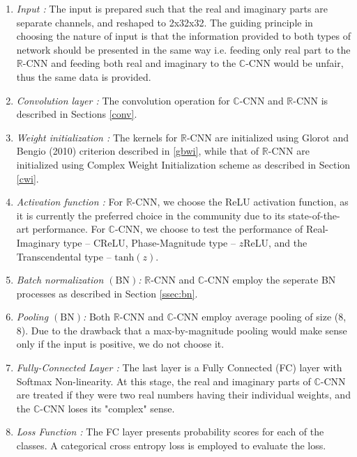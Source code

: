  
 \begin{enumerate}
 	\item \textit{Input :} The input is prepared such that the real and imaginary parts are separate channels, and reshaped to 2x32x32. The guiding principle in choosing the nature of input is that the information provided to both types of network should be presented in the same way i.e. feeding only real part to the $\mathbb{R}$-CNN and feeding both real and imaginary to the $\mathbb{C}$-CNN would be unfair, thus the same data is provided. 
 	\item \textit{Convolution layer :} The convolution operation for $\mathbb{C}$-CNN and $\mathbb{R}$-CNN is described in Sections \ref{conv}.
 	\item \textit{Weight initialization :} The kernels for $\mathbb{R}$-CNN are initialized using Glorot and Bengio (2010) criterion \cite{glorot2010understanding} described in \ref{gbwi}, while that of $\mathbb{R}$-CNN are initialized using Complex Weight Initialization scheme \cite{trabelsi2018deep} as described in Section \ref{cwi}.
 	 
 	\item \textit{Activation function :} For $\mathbb{R}$-CNN, we choose the ReLU activation function, as it is currently the preferred choice in the community due to its state-of-the-art performance. For $\mathbb{C}$-CNN, we choose to test the performance of Real-Imaginary type -- $\mathrm{C}$ReLU, Phase-Magnitude type --  $z$ReLU, and the Transcendental type -- $\mathrm{tanh}(z)$.
 	
 	\item \textit{Batch normalization $(\mathrm{BN})$:} $\mathbb{R}$-CNN and $\mathbb{C}$-CNN employ the seperate BN processes as described in Section \ref{ssec:bn}.
 	
 	\item \textit{Pooling $(\mathrm{BN})$:} Both $\mathbb{R}$-CNN and $\mathbb{C}$-CNN employ average pooling of size (8,  8). Due to the drawback that a max-by-magnitude pooling would make sense only if the input is positive, we do not choose it. 
 	
 	\item \textit{Fully-Connected Layer :}  The last layer is a Fully Connected (FC) layer with Softmax Non-linearity. At this stage, the real and imaginary parts of $\mathbb{C}$-CNN are treated if they were two real numbers having their individual weights, and the $\mathbb{C}$-CNN loses its "complex" sense.
 	
 	\item \textit{Loss Function :} The FC layer presents probability scores for each of the classes. A categorical cross entropy loss is employed to evaluate the loss.
 \end{enumerate}
 
